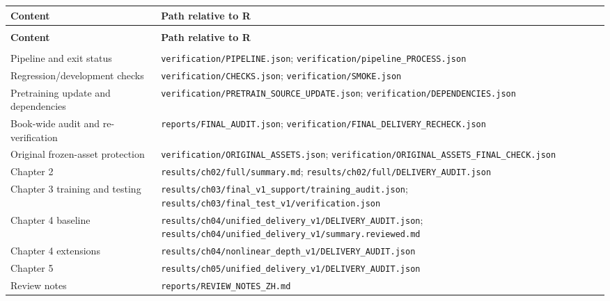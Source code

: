\documentclass[a4paper,10pt]{article}
\begin{document}
\begingroup\footnotesize
\begin{longtable}{>{\raggedright\arraybackslash}p{}>{\raggedright\arraybackslash}p{}}
\toprule
\textbf{Content} & \textbf{Path relative to R} \\
\midrule
\endfirsthead
\multicolumn{2}{l}{\color{Muted}\footnotesize Continued}\\
\toprule
\textbf{Content} & \textbf{Path relative to R} \\
\midrule
\endhead
\midrule\multicolumn{2}{r}{\color{Muted}\footnotesize Continued on next page}\\
\endfoot
\bottomrule
\endlastfoot
Pipeline and exit status & \nolinkurl{verification/PIPELINE.json}; \nolinkurl{verification/pipeline_PROCESS.json} \\[2pt]
Regression/development checks & \nolinkurl{verification/CHECKS.json}; \nolinkurl{verification/SMOKE.json} \\[2pt]
Pretraining update and dependencies & \nolinkurl{verification/PRETRAIN_SOURCE_UPDATE.json}; \nolinkurl{verification/DEPENDENCIES.json} \\[2pt]
Book-wide audit and re-verification & \nolinkurl{reports/FINAL_AUDIT.json}; \nolinkurl{verification/FINAL_DELIVERY_RECHECK.json} \\[2pt]
Original frozen-asset protection & \nolinkurl{verification/ORIGINAL_ASSETS.json}; \nolinkurl{verification/ORIGINAL_ASSETS_FINAL_CHECK.json} \\[2pt]
Chapter 2 & \nolinkurl{results/ch02/full/summary.md}; \nolinkurl{results/ch02/full/DELIVERY_AUDIT.json} \\[2pt]
Chapter 3 training and testing & \nolinkurl{results/ch03/final_v1_support/training_audit.json}; \nolinkurl{results/ch03/final_test_v1/verification.json} \\[2pt]
Chapter 4 baseline & \nolinkurl{results/ch04/unified_delivery_v1/DELIVERY_AUDIT.json}; \nolinkurl{results/ch04/unified_delivery_v1/summary.reviewed.md} \\[2pt]
Chapter 4 extensions & \nolinkurl{results/ch04/nonlinear_depth_v1/DELIVERY_AUDIT.json} \\[2pt]
Chapter 5 & \nolinkurl{results/ch05/unified_delivery_v1/DELIVERY_AUDIT.json} \\[2pt]
Review notes & \nolinkurl{reports/REVIEW_NOTES_ZH.md} \\[2pt]
\end{longtable}
\endgroup
\end{document}

